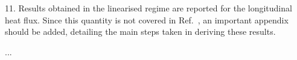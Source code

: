\documentclass{article}
\begin{document}
\begin{leftbar}
\end{leftbar}

\begin{quoting}
    11. Results obtained in the linearised regime are
    reported for the longitudinal heat flux. Since this
    quantity is not covered in Ref.~\cite{Luo2016}, an important
    appendix should be added, detailing the main steps
    taken in deriving these results.
\end{quoting}

...

\begin{leftbar}
\end{leftbar}

\printbibliography
\end{document}
